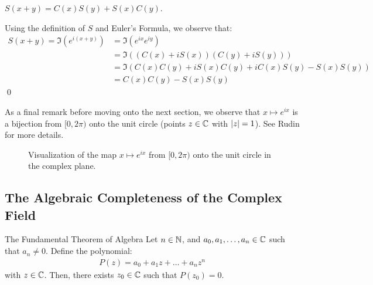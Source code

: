 \begin{ntheorem}{}{}
    $S(x + y) = C(x)S(y) + S(x)C(y)$.
\end{ntheorem}
\begin{nproof}
    Using the definition of $S$ and Euler's Formula, we observe that:
    \begin{align*}
        S(x + y) = \Im(e^{i(x + y)}) 
        &= \Im(e^{ix}e^{iy})
        \\ &= \Im((C(x) + iS(x))(C(y) + iS(y)))
        \\ &= \Im(C(x)C(y) + iS(x)C(y) + iC(x)S(y) - S(x)S(y))
        \\ &= C(x)C(y) - S(x)S(y)
    \end{align*} \qed
\end{nproof}
\noindent As a final remark before moving onto the next section, we observe that $x \mapsto e^{ix}$ is a bijection from $[0, 2\pi)$ onto the unit circle (points $z \in \mathbb{C}$ with $\abs{z} = 1$). See Rudin for more details.
\begin{figure}[htbp]
    \centering
    
    \caption{Visualization of the map $x \mapsto e^{ix}$ from $[0, 2\pi)$ onto the unit circle in the complex plane.}
    \label{fig54}
\end{figure}


\subsection{The Algebraic Completeness of the Complex Field}

\setcounter{rudin}{7}

\begin{theorem}{The Fundamental Theorem of Algebra}{}
    Let $n \in \mathbb{N}$, and $a_0, a_1, \ldots, a_n \in \mathbb{C}$ such that $a_n \neq 0$. Define the polynomial:
    \begin{align*}
        P(z) = a_0 + a_1z + \ldots + a_nz^n
    \end{align*}
    with $z \in \mathbb{C}$. Then, there exists $z_0 \in \mathbb{C}$ such that $P(z_0) = 0$. 
\end{theorem}

